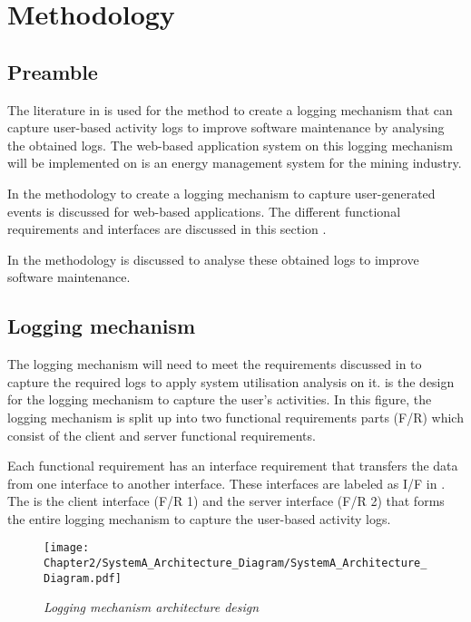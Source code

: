 \chapter{Methodology}
\label{chap:2}

\section{Preamble} The literature in  is used for the method to create a logging mechanism that can capture user-based activity logs to improve software maintenance by analysing the obtained logs. The web-based application system on this logging mechanism will be implemented on is an energy management system for the mining industry.\par In  the methodology to create a logging mechanism to capture user-generated events is discussed for web-based applications. The different functional requirements and interfaces are discussed in this section \cite{Anish2015}.\par In  the methodology is discussed to analyse these obtained logs to improve software maintenance.

\section{Logging mechanism}\label{Ch2:LoggingMechanism} The logging mechanism will need to meet the requirements discussed in  to capture the required logs to apply system utilisation analysis on it.  is the design for the logging mechanism to capture the user's activities. In this figure, the logging mechanism is split up into two functional requirements parts (F/R) which consist of the client and server functional requirements.\par Each functional requirement has an interface requirement that transfers the data from one interface to another interface. These interfaces are labeled as I/F in . The  is the client interface (F/R 1) and the server interface (F/R 2) that forms the entire logging mechanism to capture the user-based activity logs.

\begin{figure}[!htb] %
	\centering %
	\texttt{[image: Chapter2/SystemA\_Architecture\_Diagram/SystemA\_Architecture\_Diagram.pdf]}
	\caption[Logging mechanism architecture design]
	{\textit{Logging mechanism architecture design}}\label{fig:ch2_systemDesign}
\end{figure}

